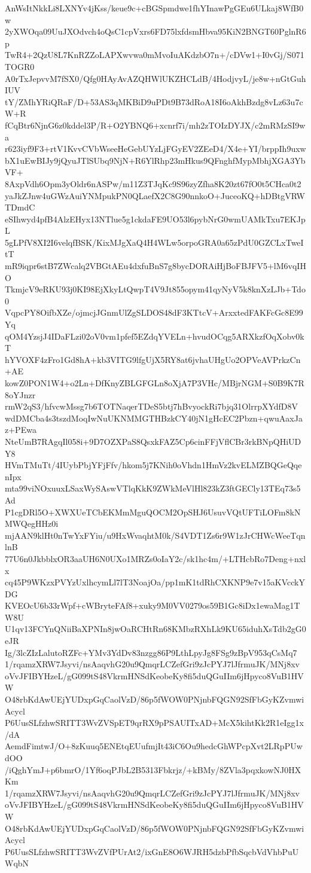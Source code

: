 AnWsItNkkLi8LXNYv4jKss/keue9c+cBGSpmdwe1fhYInawPgGEu6ULkaj8WfB0w
2yXWOqa09UuJXOdvch4oQsC1cpVxrs6FD75lxfdsmHbva95KiN2BNGT60PglnR6p
TwR4+2QzU8L7KnRZZoLAPXwvwa0mMvoIuAKdzbO7n+/cDVw1+I0vGj/S071TOGR0
A0rTxJepvvM7fSX0/Qfg0HAyAvAZQHWlUKZHCLdB/4HodjvyL/je8w+nGtGuhIUV
tY/ZMhYRiQRaF/D+53AS3qMKBiD9uPDt9B73dRoA18I6oAkhBzdg8vLz63u7cW+R
fCqBtr6NjnG6z0kddel3P/R+O2YBNQ6+xcnrf7i/mh2zTOIzDYJX/c2mRMzSI9wa
r623iyf9F3+rtV1KvvCVbWseeHeGebUYzLjFGyEV2ZEeD4/X4e+YI/brppIh9uxw
bX1uEwBIJy9jQyuJTlSUbq9NjN+R6YlRhp23mHkus9QFnghfMypMbhjXGA3YbVF+
8AxpVdh6Opm3yOldr6nASPw/m11Z3TJqKc9S96zyZfha8K20zt67fO0t5CHca0t2
yaJkZJnw4uGWzAuiYNMpukPN0QLaefX2C8G90nnkoO+JuceoKQ+hDBtgVRWTDmdC
eSIhwyd4pfB4AlzEHyx13NTlue5g1ckdaFE9UO53l6pybNrG0wmUAMkTxu7EKJpL
5gLPfV8XI2I6velqfBSK/KixMJgXaQ4H4WLw5orpoGRA0a65zPdU0GZCLxTweItT
mR9iqpr6stB7ZWcalq2VBGtAEu4dxfuBnS7g8bycDORAiHjBoFBJFV5+lM6vqIHO
TkmjcV9eRKU93j0KI98EjXkyLtQwpT4V9Jt855opym41qyNyV5k8knXzLJb+Tdo0
VqpcPY8OifbXZe/ojmcjJGnmUlZgSLDOS48dF3KTtcV+ArxxtedFAKFcGc8E99Yq
qOM4YzsjJ4IDaFLzi02oV0vm1pfef5EZdqYVELn+hvudOCqg5ARXkzfOqXobv0kT
hYVOXF4zFro1Gd8hA+kb3VITG9lfgUjX5RY8at6jvhaUHgUo2OPVeAVPrkzCn+AE
kowZ0PON1W4+o2Ln+DfKnyZBLGFGLn8oXjA7P3VHc/MBjrNGM+S0B9K7R8oYJnzr
rmW2qS3/hfvcwMssg7b6TOTNaqerTDeS5btj7hBvyockRi7bjq31OlrrpXYdfD8V
wdDMCba4s3tszdMoqIwNuUKNMMGTHBzkCY40jN1gHcEC2Pbzn+qwuAaxJaz+PEwa
NteUmB7RAgqIl058i+9D7OZXPaS8QsxkFAZ5Cp6cinFFjVflCBr3rkBNpQHiUDY8
HVmTMuTt/4IUybPbjYFjFfv/hkom5j7KNih0oVhdn1HmVz2kvELMZBQGeQqenIpx
mta99viNOxuuxLSaxWySAswVTlqKkK9ZWkMeVlHl823kZ3ftGECly13TEq73s5Ad
P1cgDRl5O+XWXUeTCbEKMmMguQOCM2OpSHJ6UsuvVQtUFTiLOFm8kNMWQegHHz0i
mjAAN9klHt0nTwYxFYiu/u9HxWvaqhtM0k/S4VDT1Zs6r9W1zJrCHWcWeeTqnlnB
77U6n0JkbblxOR3aaUH6N0UXo1MRZs0oIaY2c/sk1hc4m/+LTHcbRo7Deng+nxlx
cq45P9WKzxPVYzUxlhcymLl7lT3NoajOa/pp1mK1tdRhCXKNP9e7v15aKVcckYDG
KVEOcU6b33rWpf+cWBryteFAf8+xuky9M0VV0279os59B1Gc8iDx1ewaMag1TW8U
U1qv13FCYnQNiiBaXPNIn8jwOaRCHtRn68KMbzRXhLk9KU65iduhXsTdb2gG0eJR
Ig/3lcZIzLalutoRZFc+YMv3YdDv83nzgg86P9LthLpyJg8FSg9zBpV953qCsMq7
1/rqamzXRW7Jsyvi/nsAaqvhG20u9QmqrLCZefGri9zJcPYJ7lJfrmuJK/MNj8xv
oVvJFIBYHzeL/gG099tS48VkrmHNSdKeobeKy8fi5duQGuIIm6jHpyco8VuB1HVW
O48rbKdAwUEjYUDxpGqCaolVzD/86p5fWOW0PNjnbFQGN92SfFbGyKZvmwiAcycl
P6UusSLfzhwSRITT3WvZVSpET9qrRX9pPSAUITxAD+McX5kihtKk2R1eIgg1x/dA
AemdFimtwJ/O+8zKuuq5ENEtqEUufmjIt43iC6Ou9hedcGhWPcpXvt2LRpPUwdOO
/iQghYmJ+p6bmrO/1Yf6oqPJbL2B5313Fbkrjz/+kBMy/8ZVla3pqxkowNJ0HXKm
1/rqamzXRW7Jsyvi/nsAaqvhG20u9QmqrLCZefGri9zJcPYJ7lJfrmuJK/MNj8xv
oVvJFIBYHzeL/gG099tS48VkrmHNSdKeobeKy8fi5duQGuIIm6jHpyco8VuB1HVW
O48rbKdAwUEjYUDxpGqCaolVzD/86p5fWOW0PNjnbFQGN92SfFbGyKZvmwiAcycl
P6UusSLfzhwSRITT3WvZVfPUrAt2/ixGnE8O6WJRH5dzbPfbSqcbVdVhbPuUWqbN
